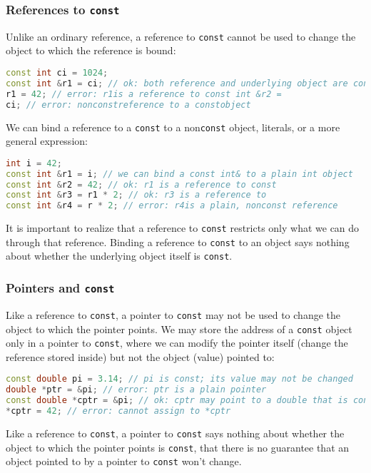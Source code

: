 \subsubsection*{References to \texttt{const}}

Unlike an ordinary reference, a reference to \texttt{const} cannot be used to change the object to which the reference is bound:
\begin{lstlisting}[language=C++]
const int ci = 1024; 
const int &r1 = ci; // ok: both reference and underlying object are const 
r1 = 42; // error: r1is a reference to const int &r2 = 
ci; // error: nonconstreference to a constobject
\end{lstlisting}

We can bind a reference to a \texttt{const} to a non\texttt{const} object, literals, or a more general expression:
\begin{lstlisting}[language=C++]
int i = 42;
const int &r1 = i; // we can bind a const int& to a plain int object 
const int &r2 = 42; // ok: r1 is a reference to const 
const int &r3 = r1 * 2; // ok: r3 is a reference to 
const int &r4 = r * 2; // error: r4is a plain, nonconst reference
\end{lstlisting}
It is important to realize that a reference to \texttt{const} restricts only what we can do through that reference. Binding a reference to \texttt{const} to an object says nothing about whether the underlying object itself is \texttt{const}.

\subsubsection{Pointers and \texttt{const}}

Like a reference to \texttt{const}, a pointer to \texttt{const} may not be used to change the object to which the pointer points. We may store the address of a \texttt{const} object only in a pointer to \texttt{const}, where we can modify the pointer itself (change the reference stored inside) but not the object (value) pointed to:
\begin{lstlisting}[language=C++]
const double pi = 3.14; // pi is const; its value may not be changed 
double *ptr = &pi; // error: ptr is a plain pointer 
const double *cptr = &pi; // ok: cptr may point to a double that is const 
*cptr = 42; // error: cannot assign to *cptr
\end{lstlisting}
Like a reference to \texttt{const}, a pointer to \texttt{const} says nothing about whether the object to which the pointer points is \texttt{const}, that there is no guarantee that an object pointed to by a pointer to \texttt{const} won't change.

